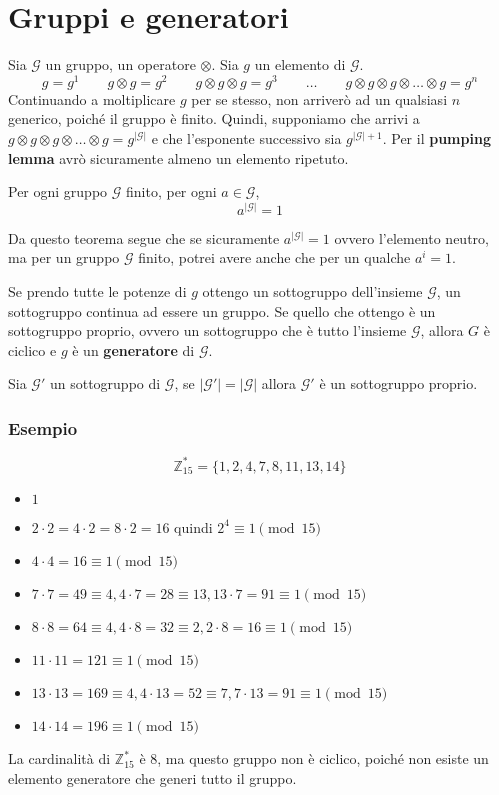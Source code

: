 \section{Gruppi e generatori}
Sia $\mathcal{G}$ un gruppo, un operatore $\otimes$. Sia $g$ un elemento di $\mathcal{G}$.
\[
  g = g^1 \qquad g \otimes g = g^2 \qquad g \otimes g \otimes g = g^3 \qquad \dots \qquad g \otimes g 
  \otimes g \otimes \dots \otimes g = g^n
\]
Continuando a moltiplicare $g$ per se stesso, non arriverò ad un qualsiasi $n$ generico, poiché 
il gruppo è finito. Quindi, supponiamo  che arrivi a $g \otimes g 
\otimes g \otimes \dots \otimes g = g^{\lvert \mathcal{G} \rvert}$ e che l'esponente successivo 
sia $g^{\lvert \mathcal{G} \rvert + 1}$. Per il \textbf{pumping lemma} avrò sicuramente 
almeno un elemento ripetuto.
\begin{theorem}
  Per ogni gruppo $\mathcal{G}$ finito, per ogni $a \in \mathcal{G}$,
  \[
    a^{\lvert \mathcal{G} \rvert} = 1
  \]
\end{theorem}
Da questo teorema segue che se sicuramente $a^{\lvert \mathcal{G} \rvert} = 1$ ovvero l'elemento neutro,
ma per un gruppo $\mathcal{G}$ finito, potrei avere anche che per un qualche
$a^i = 1$.

Se prendo tutte le potenze di $g$ ottengo un sottogruppo dell'insieme $\mathcal{G}$, un sottogruppo 
continua ad essere un gruppo. Se quello che ottengo è un sottogruppo proprio, ovvero 
un sottogruppo che è tutto l'insieme $\mathcal{G}$, allora $G$ è ciclico e $g$ è un 
\textbf{generatore} di $\mathcal{G}$.
\begin{theorem}
  Sia $\mathcal{G}'$ un sottogruppo di $\mathcal{G}$, se $|\mathcal{G}'| = |\mathcal{G}|$
  allora $\mathcal{G}'$ è un sottogruppo proprio.
\end{theorem}
\subsubsection{Esempio}
\[
  \mathbb{Z}_{15}^* = \{1,2,4,7,8,11,13,14\}
\]
\begin{itemize}
  \item $1$
  \item $2 \cdot 2 = 4 \cdot 2 = 8 \cdot 2 = 16$ quindi $2^4 \equiv 1 \pmod{15}$
  \item $4 \cdot 4 = 16 \equiv 1 \pmod{15}$
  \item $7 \cdot 7 = 49 \equiv 4, 4 \cdot 7 = 28 \equiv 13, 13 \cdot 7 = 91 \equiv 1 \pmod{15}$
  \item $8 \cdot 8 = 64 \equiv 4, 4 \cdot 8 = 32 \equiv 2, 2 \cdot 8 = 16 \equiv 1 \pmod{15}$
  \item $11 \cdot 11 = 121 \equiv 1 \pmod{15}$
  \item $13 \cdot 13 = 169 \equiv 4, 4 \cdot 13 = 52 \equiv 7, 7 \cdot 13 = 91 \equiv 1 \pmod{15}$
  \item $14 \cdot 14 = 196 \equiv 1 \pmod{15}$
\end{itemize}
La cardinalità di $\mathbb{Z}_{15}^*$ è $8$, ma questo gruppo non è ciclico, poiché non esiste un
elemento generatore che generi tutto il gruppo.
